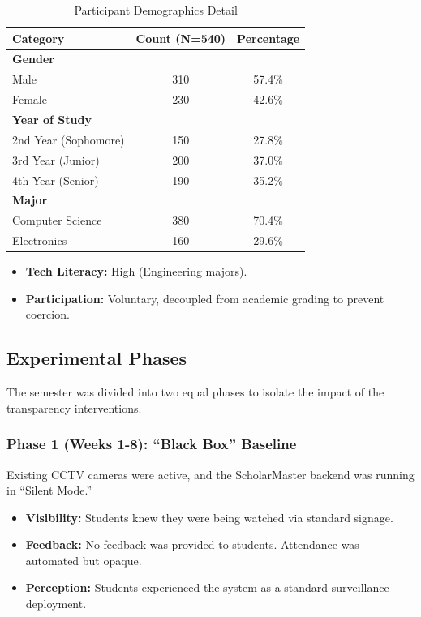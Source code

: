 \documentclass[conference]{IEEEtran}
\begin{document}
\begin{table}[htbp]
\caption{Participant Demographics Detail}
\begin{center}
\begin{tabular}{lcc}
\toprule
\textbf{Category} & \textbf{Count (N=540)} & \textbf{Percentage} \\
\midrule
\textbf{Gender} & & \\
Male & 310 & 57.4\% \\
Female & 230 & 42.6\% \\
\midrule
\textbf{Year of Study} & & \\
2nd Year (Sophomore) & 150 & 27.8\% \\
3rd Year (Junior) & 200 & 37.0\% \\
4th Year (Senior) & 190 & 35.2\% \\
\midrule
\textbf{Major} & & \\
Computer Science & 380 & 70.4\% \\
Electronics & 160 & 29.6\% \\
\bottomrule
\end{tabular}
\end{center}
\label{tab:demographics}
\end{table}

\begin{itemize}
    \item \textbf{Tech Literacy:} High (Engineering majors).
    \item \textbf{Participation:} Voluntary, decoupled from academic grading to prevent coercion.
\end{itemize}

\subsection{Experimental Phases}
The semester was divided into two equal phases to isolate the impact of the transparency interventions.

\subsubsection{Phase 1 (Weeks 1-8): ``Black Box'' Baseline}
Existing CCTV cameras were active, and the ScholarMaster backend was running in ``Silent Mode.''
\begin{itemize}
    \item \textbf{Visibility:} Students knew they were being watched via standard signage.
    \item \textbf{Feedback:} No feedback was provided to students. Attendance was automated but opaque.
    \item \textbf{Perception:} Students experienced the system as a standard surveillance deployment.
\end{itemize}
\end{document}
